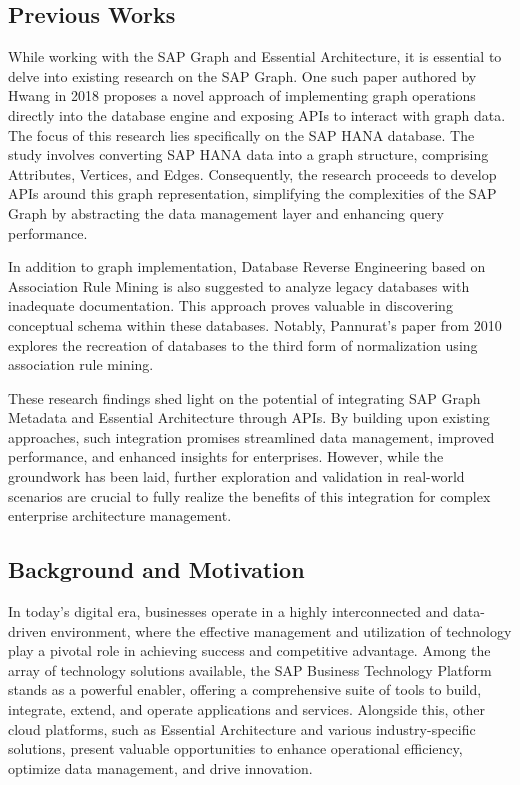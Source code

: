 \documentclass{article}
\begin{document}
\maketitle
\subsection{Previous Works}
While working with the SAP Graph and Essential Architecture, it is essential to delve into existing research on the SAP Graph. One such paper authored by Hwang in 2018 proposes a novel approach of implementing graph operations directly into the database engine and exposing APIs to interact with graph data. The focus of this research lies specifically on the SAP HANA database. The study involves converting SAP HANA data into a graph structure, comprising Attributes, Vertices, and Edges. Consequently, the research proceeds to develop APIs around this graph representation, simplifying the complexities of the SAP Graph by abstracting the data management layer and enhancing query performance. \parencite{hwang2018}

In addition to graph implementation, Database Reverse Engineering based on Association Rule Mining is also suggested to analyze legacy databases with inadequate documentation. This approach proves valuable in discovering conceptual schema within these databases. Notably, Pannurat's paper from 2010 \parencite{pannurat2010} explores the recreation of databases to the third form of normalization using association rule mining.

These research findings shed light on the potential of integrating SAP Graph Metadata and Essential Architecture through APIs. By building upon existing approaches, such integration promises streamlined data management, improved performance, and enhanced insights for enterprises. However, while the groundwork has been laid, further exploration and validation in real-world scenarios are crucial to fully realize the benefits of this integration for complex enterprise architecture management.

\maketitle
\subsection{Background and Motivation}
In today's digital era, businesses operate in a highly interconnected and data-driven environment, where the effective management and utilization of technology play a pivotal role in achieving success and competitive advantage. Among the array of technology solutions available, the SAP Business Technology Platform stands as a powerful enabler, offering a comprehensive suite of tools to build, integrate, extend, and operate applications and services. Alongside this, other cloud platforms, such as Essential Architecture and various industry-specific solutions, present valuable opportunities to enhance operational efficiency, optimize data management, and drive innovation.
\end{document}
